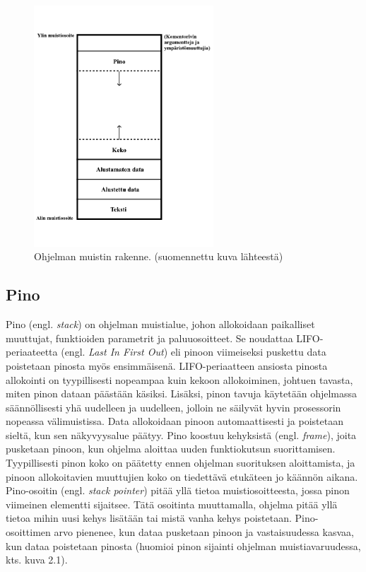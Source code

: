 \begin{figure}[tbh]
{\begin{centering}
\includegraphics[width=0.6\textwidth]{kuvat/muistin_rakenne.pdf}
\par\end{centering}}
\caption{Ohjelman muistin rakenne.\cite{mmic2010} (suomennettu kuva lähteestä)}
\end{figure}

\subsection{Pino}

Pino (engl. \textit{stack}) on ohjelman muistialue, johon allokoidaan paikalliset muuttujat, funktioiden parametrit ja paluuosoitteet. Se noudattaa LIFO-periaateetta (engl. \textit{Last In First Out}) eli pinoon viimeiseksi puskettu data poistetaan pinosta myös ensimmäisenä. LIFO-periaatteen ansiosta pinosta allokointi on tyypillisesti nopeampaa kuin kekoon allokoiminen, johtuen tavasta, miten pinon dataan päästään käsiksi. Lisäksi, pinon tavuja käytetään ohjelmassa säännöllisesti yhä uudelleen ja uudelleen, jolloin ne säilyvät hyvin prosessorin nopeassa välimuistissa. Data allokoidaan pinoon automaattisesti ja poistetaan sieltä, kun sen näkyvyysalue päätyy. Pino koostuu kehyksistä (engl. \textit{frame}), joita pusketaan pinoon, kun ohjelma aloittaa uuden funktiokutsun suorittamisen. Tyypillisesti pinon koko on päätetty ennen ohjelman suorituksen aloittamista, ja pinoon allokoitavien muuttujien koko on tiedettävä etukäteen jo käännön aikana.\cite{mmic2010}
Pino-osoitin (engl. \textit{stack pointer}) pitää yllä tietoa muistiosoitteesta, jossa pinon viimeinen elementti sijaitsee. Tätä osoitinta muuttamalla, ohjelma pitää yllä tietoa mihin uusi kehys lisätään tai mistä vanha kehys poistetaan. Pino-osoittimen arvo pienenee, kun dataa pusketaan pinoon ja vastaisuudessa kasvaa, kun dataa poistetaan pinosta (huomioi pinon sijainti ohjelman muistiavaruudessa, kts. kuva 2.1).\cite{sasp2006}

